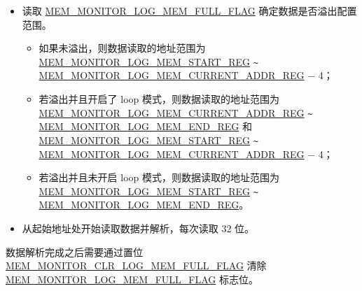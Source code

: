 \documentclass[main\_\_CN.tex]{subfiles}
\begin{document}
\begin{itemize}
    \item 读取 \hyperref[fielddesc:MEMMONITORLOGMEMFULLFLAG]{MEM\_MONITOR\_LOG\_MEM\_FULL\_FLAG} 确定数据是否溢出配置范围。
    \begin{itemize}
        \item 如果未溢出，则数据读取的地址范围为 \hyperref[regdesc:MEMMONITORLOGMEMSTARTREG]{MEM\_MONITOR\_LOG\_MEM\_START\_REG}  \verb+~+ \hyperref[regdesc:MEMMONITORLOGMEMCURRENTADDRREG]{MEM\_MONITOR\_LOG\_MEM\_CURRENT\_ADDR\_REG} $-$ 4；
        \item 若溢出并且开启了 loop 模式，则数据读取的地址范围为 \hyperref[regdesc:MEMMONITORLOGMEMCURRENTADDRREG]{MEM\_MONITOR\_LOG\_MEM\_CURRENT\_ADDR\_REG} \verb+~+ \hyperref[regdesc:MEMMONITORLOGMEMENDREG]{MEM\_MONITOR\_LOG\_MEM\_END\_REG} 和 \hyperref[regdesc:MEMMONITORLOGMEMSTARTREG]{MEM\_MONITOR\_LOG\_MEM\_START\_REG} \verb+~+ \hyperref[regdesc:MEMMONITORLOGMEMCURRENTADDRREG]{MEM\_MONITOR\_LOG\_MEM\_CURRENT\_ADDR\_REG} $-$ 4；
        \item 若溢出并且未开启 loop 模式，则数据读取的地址范围为 \hyperref[regdesc:MEMMONITORLOGMEMSTARTREG]{MEM\_MONITOR\_LOG\_MEM\_START\_REG} \verb+~+ \hyperref[regdesc:MEMMONITORLOGMEMENDREG]{MEM\_MONITOR\_LOG\_MEM\_END\_REG}。
    \end{itemize}
    \item 从起始地址处开始读取数据并解析，每次读取 32 位。
\end{itemize}

数据解析完成之后需要通过置位 \hyperref[fielddesc:MEMMONITORCLRLOGMEMFULLFLAG]{MEM\_MONITOR\_CLR\_LOG\_MEM\_FULL\_FLAG} 清除 \hyperref[fielddesc:MEMMONITORLOGMEMFULLFLAG]{MEM\_MONITOR\_LOG\_MEM\_FULL\_FLAG} 标志位。


\end{document}
